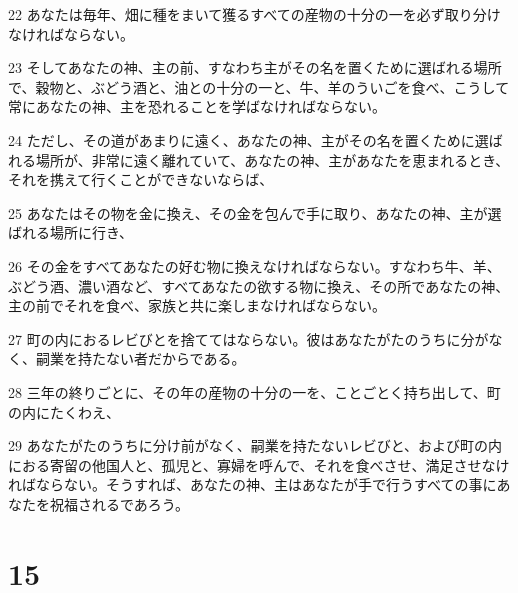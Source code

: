 \par 22 あなたは毎年、畑に種をまいて獲るすべての産物の十分の一を必ず取り分けなければならない。
\par 23 そしてあなたの神、主の前、すなわち主がその名を置くために選ばれる場所で、穀物と、ぶどう酒と、油との十分の一と、牛、羊のういごを食べ、こうして常にあなたの神、主を恐れることを学ばなければならない。
\par 24 ただし、その道があまりに遠く、あなたの神、主がその名を置くために選ばれる場所が、非常に遠く離れていて、あなたの神、主があなたを恵まれるとき、それを携えて行くことができないならば、
\par 25 あなたはその物を金に換え、その金を包んで手に取り、あなたの神、主が選ばれる場所に行き、
\par 26 その金をすべてあなたの好む物に換えなければならない。すなわち牛、羊、ぶどう酒、濃い酒など、すべてあなたの欲する物に換え、その所であなたの神、主の前でそれを食べ、家族と共に楽しまなければならない。
\par 27 町の内におるレビびとを捨ててはならない。彼はあなたがたのうちに分がなく、嗣業を持たない者だからである。
\par 28 三年の終りごとに、その年の産物の十分の一を、ことごとく持ち出して、町の内にたくわえ、
\par 29 あなたがたのうちに分け前がなく、嗣業を持たないレビびと、および町の内におる寄留の他国人と、孤児と、寡婦を呼んで、それを食べさせ、満足させなければならない。そうすれば、あなたの神、主はあなたが手で行うすべての事にあなたを祝福されるであろう。

\chapter{15}


